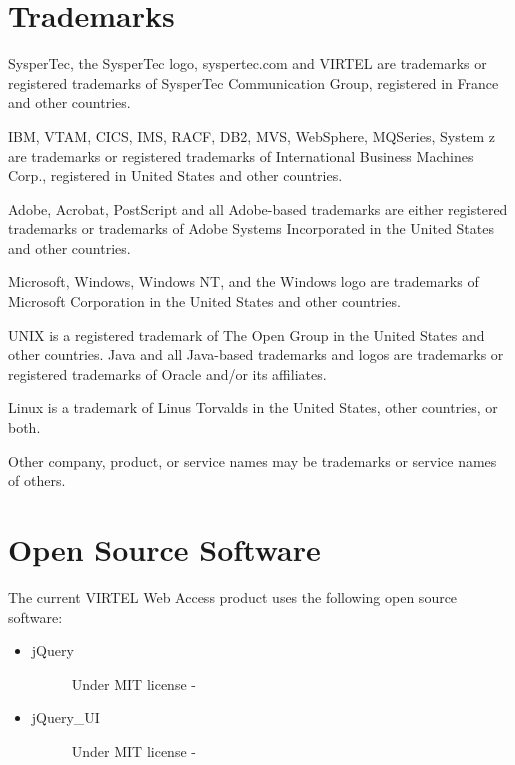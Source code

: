 \documentclass[letterpaper,10pt,english]{sphinxmanual}
\begin{document}
\section{Trademarks}
\label{\detokenize{audit_operations_ and_performance:trademarks}}
SysperTec, the SysperTec logo, syspertec.com and VIRTEL are trademarks or registered trademarks of SysperTec Communication Group, registered in France and other countries.

IBM, VTAM, CICS, IMS, RACF, DB2, MVS, WebSphere, MQSeries, System z are trademarks or registered trademarks of International Business Machines Corp., registered in United States and other countries.

Adobe, Acrobat, PostScript and all Adobe-based trademarks are either registered trademarks or trademarks of Adobe Systems Incorporated in the United States and other countries.

Microsoft, Windows, Windows NT, and the Windows logo are trademarks of Microsoft Corporation in the United States and other countries.

UNIX is a registered trademark of The Open Group in the United States and other countries. Java and all Java-based trademarks and logos are trademarks or registered trademarks of Oracle and/or its affiliates.

Linux is a trademark of Linus Torvalds in the United States, other countries, or both.

Other company, product, or service names may be trademarks or service names of others.


\section{Open Source Software}
\label{\detokenize{audit_operations_ and_performance:open-source-software}}
The current VIRTEL Web Access product uses the following open source software:
\begin{itemize}
\item {} \begin{description}
\item[{jQuery}] \leavevmode
Under MIT license - 

\end{description}

\item {} \begin{description}
\item[{jQuery\_UI}] \leavevmode
Under MIT license - 

\end{description}

\end{itemize}



\renewcommand{\indexname}{Index}
\printindex
\end{document}
